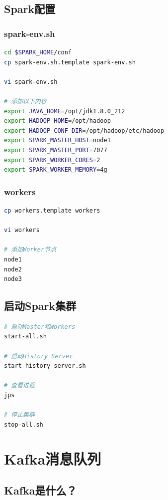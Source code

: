 \documentclass[12pt,a4paper]{article}
\begin{document}
\subsection{Spark配置}

\subsubsection{spark-env.sh}

\begin{lstlisting}[language=bash]
cd $SPARK_HOME/conf
cp spark-env.sh.template spark-env.sh

vi spark-env.sh

# 添加以下内容
export JAVA_HOME=/opt/jdk1.8.0_212
export HADOOP_HOME=/opt/hadoop
export HADOOP_CONF_DIR=/opt/hadoop/etc/hadoop
export SPARK_MASTER_HOST=node1
export SPARK_MASTER_PORT=7077
export SPARK_WORKER_CORES=2
export SPARK_WORKER_MEMORY=4g
\end{lstlisting}

\subsubsection{workers}

\begin{lstlisting}[language=bash]
cp workers.template workers

vi workers

# 添加Worker节点
node1
node2
node3
\end{lstlisting}

\subsection{启动Spark集群}

\begin{lstlisting}[language=bash]
# 启动Master和Workers
start-all.sh

# 启动History Server
start-history-server.sh

# 查看进程
jps

# 停止集群
stop-all.sh
\end{lstlisting}

\section{Kafka消息队列}

\subsection{Kafka是什么？}
\end{document}
